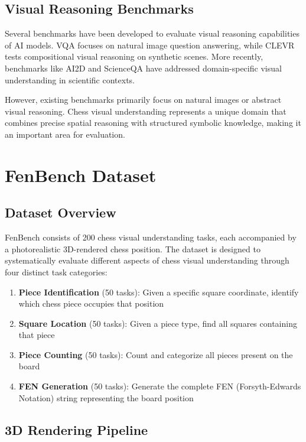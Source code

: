 \documentclass{article}
\begin{document}
\subsection{Visual Reasoning Benchmarks}
Several benchmarks have been developed to evaluate visual reasoning capabilities of AI models. VQA \cite{antol2015vqa} focuses on natural image question answering, while CLEVR \cite{johnson2017clevr} tests compositional visual reasoning on synthetic scenes. More recently, benchmarks like AI2D \cite{kembhavi2016diagram} and ScienceQA \cite{lu2022learn} have addressed domain-specific visual understanding in scientific contexts.

However, existing benchmarks primarily focus on natural images or abstract visual reasoning. Chess visual understanding represents a unique domain that combines precise spatial reasoning with structured symbolic knowledge, making it an important area for evaluation.

\section{FenBench Dataset}

\subsection{Dataset Overview}

FenBench consists of 200 chess visual understanding tasks, each accompanied by a photorealistic 3D-rendered chess position. The dataset is designed to systematically evaluate different aspects of chess visual understanding through four distinct task categories:

\begin{enumerate}
    \item \textbf{Piece Identification} (50 tasks): Given a specific square coordinate, identify which chess piece occupies that position
    \item \textbf{Square Location} (50 tasks): Given a piece type, find all squares containing that piece
    \item \textbf{Piece Counting} (50 tasks): Count and categorize all pieces present on the board
    \item \textbf{FEN Generation} (50 tasks): Generate the complete FEN (Forsyth-Edwards Notation) string representing the board position
\end{enumerate}

\subsection{3D Rendering Pipeline}
\end{document}
